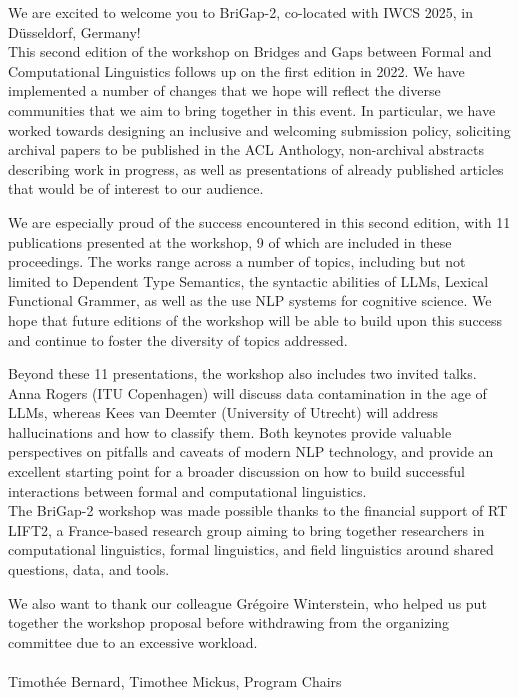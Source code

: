 We are excited to welcome you to BriGap-2, co-located with IWCS 2025, in Düsseldorf, Germany!\\

This second edition of the workshop on Bridges and Gaps between Formal and Computational Linguistics follows up on the first edition in 2022.
We have implemented a number of changes that we hope will reflect the diverse communities that we aim to bring together in this event.
In particular, we have worked towards designing an inclusive and welcoming submission policy, soliciting archival papers to be published in the ACL Anthology, non-archival abstracts describing work in progress, as well as presentations of already published articles that would be of interest to our audience.

We are especially proud of the success encountered in this second edition, with 11 publications presented at the workshop, 9 of which are included in these proceedings.
The works range across a number of topics, including but not limited to Dependent Type Semantics, the syntactic abilities of LLMs, Lexical Functional Grammer, as well as the use NLP systems for cognitive science.
We hope that future editions of the workshop will be able to build upon this success and continue to foster the diversity of topics addressed.

Beyond these 11 presentations, the workshop also includes two invited talks. 
Anna Rogers (ITU Copenhagen) will discuss data contamination in the age of LLMs, whereas Kees van Deemter (University of Utrecht) will address hallucinations and how to classify them.
Both keynotes provide valuable perspectives on pitfalls and caveats of modern NLP technology, and provide an excellent starting point for a broader discussion on how to build successful interactions between formal and computational linguistics.\\

The BriGap-2 workshop was made possible thanks to the financial support of RT LIFT2, a France-based research group aiming to bring together researchers in computational linguistics, formal linguistics, and field linguistics around shared questions, data, and tools.

We also want to thank our colleague Grégoire Winterstein, who helped us put together the workshop proposal before withdrawing from the organizing committee due to an excessive workload.\\\\

Timothée Bernard, Timothee Mickus, Program Chairs
